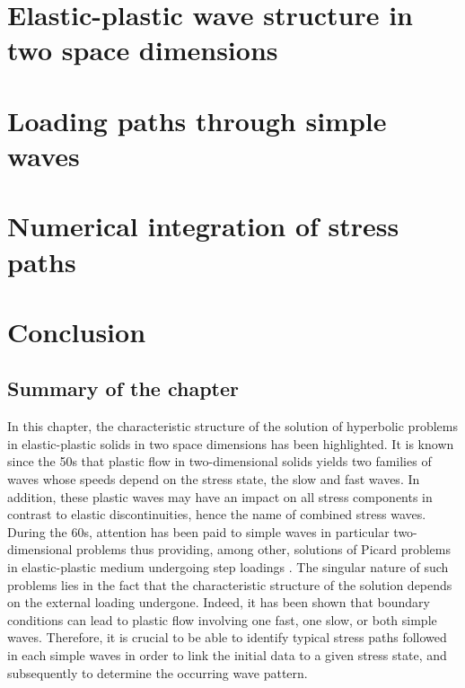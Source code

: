 

\section{Elastic-plastic wave structure in two space dimensions}
\label{sec:charac_plast}


\section{Loading paths through simple waves}
\label{sec:stress_paths}



\section{Numerical integration of stress paths}
\label{sec:stress_paths_num}


% 


\section{Conclusion}

\subsection{Summary of the chapter}

In this chapter, the characteristic structure of the solution of hyperbolic problems in elastic-plastic solids in two space dimensions has been highlighted.
It is known since the 50s that plastic flow in two-dimensional solids yields two families of waves whose speeds depend on the stress state, the slow and fast waves.
In addition, these plastic waves may have an impact on all stress components in contrast to elastic discontinuities, hence the name of combined stress waves.
During the 60s, attention has been paid to simple waves in particular two-dimensional problems thus providing, among other, solutions of Picard problems in elastic-plastic medium undergoing step loadings \cite{Clifton,Ting68,Ting73}. %
The singular nature of such problems lies in the fact that the characteristic structure of the solution depends on the external loading undergone.
Indeed, it has been shown \cite{Clifton} that boundary conditions can lead to plastic flow involving one fast, one slow, or both simple waves.
Therefore, it is crucial to be able to identify typical stress paths followed in each simple waves in order to link the initial data to a given stress state, and subsequently to determine the occurring wave pattern.

